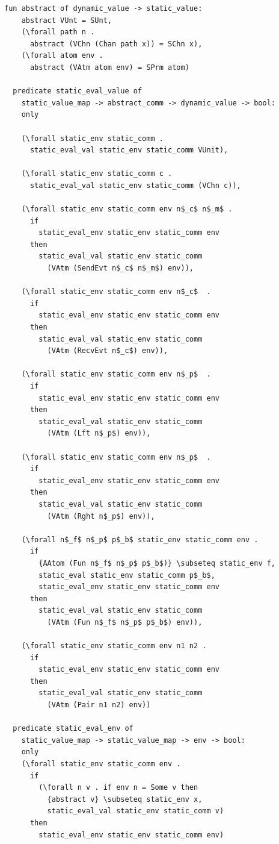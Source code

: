 \documentclass[10pt]{article}
\begin{document}
\begin{lstlisting}[language=logic, mathescape]
  fun abstract of dynamic_value -> static_value:
    abstract VUnt = SUnt, 
    (\forall path n . 
      abstract (VChn (Chan path x)) = SChn x),
    (\forall atom env .
      abstract (VAtm atom env) = SPrm atom)

  predicate static_eval_value of
    static_value_map -> abstract_comm -> dynamic_value -> bool: 
    only

    (\forall static_env static_comm .
      static_eval_val static_env static_comm VUnit),

    (\forall static_env static_comm c .
      static_eval_val static_env static_comm (VChn c)),

    (\forall static_env static_comm env n$_c$ n$_m$ .
      if
        static_eval_env static_env static_comm env
      then
        static_eval_val static_env static_comm
          (VAtm (SendEvt n$_c$ n$_m$) env)),

    (\forall static_env static_comm env n$_c$  .
      if
        static_eval_env static_env static_comm env
      then
        static_eval_val static_env static_comm
          (VAtm (RecvEvt n$_c$) env)),

    (\forall static_env static_comm env n$_p$  .
      if
        static_eval_env static_env static_comm env
      then
        static_eval_val static_env static_comm
          (VAtm (Lft n$_p$) env)),
        
    (\forall static_env static_comm env n$_p$  .
      if
        static_eval_env static_env static_comm env
      then
        static_eval_val static_env static_comm
          (VAtm (Rght n$_p$) env)),

    (\forall n$_f$ n$_p$ p$_b$ static_env static_comm env .
      if
        {AAtom (Fun n$_f$ n$_p$ p$_b$)} \subseteq static_env f, 
        static_eval static_env static_comm p$_b$, 
        static_eval_env static_env static_comm env
      then
        static_eval_val static_env static_comm
          (VAtm (Fun n$_f$ n$_p$ p$_b$) env)),

    (\forall static_env static_comm env n1 n2 .
      if
        static_eval_env static_env static_comm env
      then
        static_eval_val static_env static_comm
          (VAtm (Pair n1 n2) env))

  predicate static_eval_env of
    static_value_map -> static_value_map -> env -> bool:
    only 
    (\forall static_env static_comm env .
      if
        (\forall n v . if env n = Some v then
          {abstract v} \subseteq static_env x,
          static_eval_val static_env static_comm v)
      then 
        static_eval_env static_env static_comm env)


\end{lstlisting}
\end{document}
